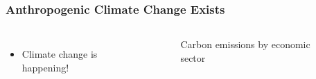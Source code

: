 \begin{frame}
    \frametitle{Anthropogenic Climate Change Exists}


    \begin{columns}
        \column[t]{5cm}
        \begin{itemize}
            \item Climate change is happening!
        \end{itemize}
        
        \column[t]{5cm}
        \begin{figure}
            \centering
            \resizebox{\columnwidth}{!}{}
            \caption{Carbon emissions by economic sector}
            \label{figure:sector-emissions}
        \end{figure}
    \end{columns}
    

\end{frame}